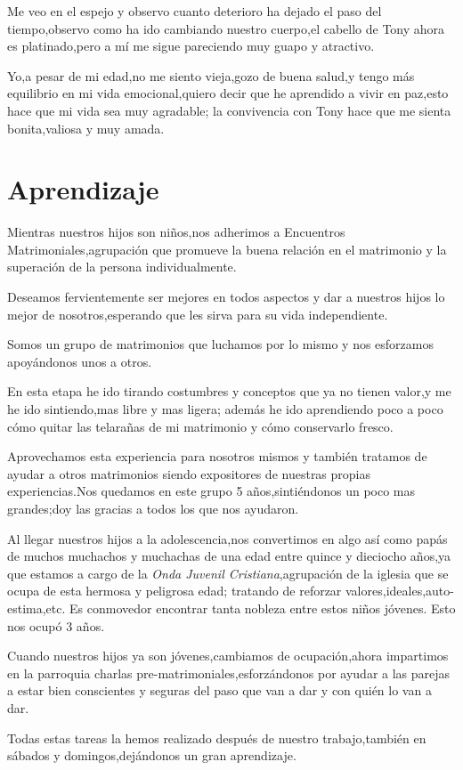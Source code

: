 \documentclass[letterpaper,12pt]{book}
\begin{document}
Me veo en el espejo y observo cuanto deterioro ha dejado el paso del tiempo,observo como ha ido cambiando nuestro cuerpo,el cabello de Tony ahora es platinado,pero a mí me sigue pareciendo muy guapo y atractivo.

Yo,a pesar de mi edad,no me siento vieja,gozo de buena salud,y tengo más equilibrio en mi vida emocional,quiero decir que he aprendido a vivir en paz,esto hace que mi vida sea muy agradable; la convivencia con Tony hace que me sienta bonita,valiosa y muy amada.
\chapter{Aprendizaje}
Mientras nuestros hijos son niños,nos adherimos a Encuentros Matrimoniales,agrupación que promueve la buena relación en el matrimonio y la superación de la persona individualmente.

Deseamos fervientemente ser mejores en todos aspectos y dar a nuestros hijos lo mejor de nosotros,esperando que les sirva para su vida independiente.

Somos un grupo de matrimonios que luchamos por lo mismo y nos esforzamos apoyándonos unos a otros.

En esta etapa he ido tirando costumbres y conceptos que ya no tienen valor,y me he ido sintiendo,mas libre y mas ligera;
además he ido aprendiendo poco a poco cómo quitar las telarañas de mi matrimonio y cómo conservarlo fresco.

Aprovechamos esta experiencia para nosotros mismos y también tratamos de ayudar a otros matrimonios siendo expositores de nuestras propias experiencias.Nos quedamos en este grupo 5 años,sintiéndonos un poco mas grandes;doy las gracias a todos los que nos ayudaron.

Al llegar nuestros hijos a la adolescencia,nos convertimos en algo así como papás de muchos muchachos y muchachas de una edad entre quince y dieciocho años,ya que estamos a cargo de la {\it Onda Juvenil Cristiana},agrupación de la iglesia que se ocupa de esta hermosa y peligrosa edad; tratando de reforzar valores,ideales,auto-estima,etc. Es conmovedor encontrar tanta nobleza entre estos niños jóvenes. Esto nos ocupó 3 años.

Cuando nuestros hijos ya son jóvenes,cambiamos de ocupación,ahora impartimos en la parroquia charlas pre-matrimoniales,esforzándonos por ayudar a las parejas a estar bien conscientes y seguras del paso que van a dar y con quién lo van a dar.

Todas estas tareas la hemos realizado después de nuestro trabajo,también en sábados y domingos,dejándonos un gran aprendizaje.
\end{document}
